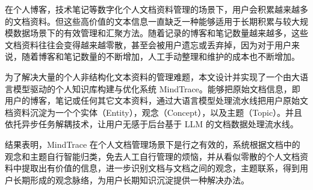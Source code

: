
{}

\begin{abstractcn}
  在个人博客，技术笔记等数字化个人文档资料管理的场景下，用户会积累越来越多的文档资料。但这些高价值的文本信息一直缺乏一种能够适用于长期积累与较大规模数据场景下的有效管理和汇聚方法。随着记录的博客和笔记数量越来越多，这些文档资料往往会变得越来越零散，甚至会被用户遗忘或丢弃掉，因为对于用户来说，随着博客和笔记数量的不断增加，人工手动整理和维护的成本也不断增加。

  为了解决大量的个人非结构化文本资料的管理难题，本文设计并实现了一个由大语言模型驱动的个人知识库构建与优化系统 MindTrace。能够把原始文档信息，即用户的博客，笔记或任何其它文本资料，通过大语言模型处理流水线把用户原始文档资料沉淀为一个个实体（Entity），观念（Concept），以及主题（Topic）。并且依托异步任务解耦技术，让用户无感于后台基于 LLM 的文档数据处理流水线。

  结果表明，MindTrace 在个人文档管理场景下是行之有效的，系统根据文档中的观念和主题自行智能归类，免去人工自行管理的烦恼，并从看似零散的个人文档资料中提取出有价值的信息，进一步识别文档与文档之间的观念，主题联系，得到用户长期形成的观念脉络，为用户长期知识沉淀提供一种解决办法。
\end{abstractcn}
